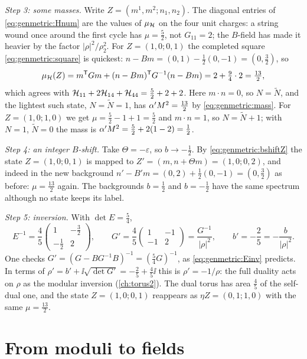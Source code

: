 \emph{Step 3: some masses.} Write $Z=(m^1,m^2;n_1,n_2)$. The diagonal entries of
\eqref{eq:genmetric:Hnum} are the values of $\mu_{\mathcal{H}}$ on the four unit charges: a string
wound once around the first cycle has $\mu=\frac52$, not $G_{11}=2$; the $B$-field has made
it heavier by the factor $|\rho|^2/\rho_2^2$. For $Z=(1,0;0,1)$ the completed square
\eqref{eq:genmetric:square} is quickest: $n-Bm=(0,1)-\tfrac12(0,-1)=(0,\tfrac32)$, so
\[
 \mu_{\mathcal{H}}(Z)=m^{\mathsf T}Gm+(n-Bm)^{\mathsf T}G^{-1}(n-Bm)=2+\tfrac94\cdot2=\tfrac{13}2,
\]
which agrees with $\mathcal{H}_{11}+2\mathcal{H}_{14}+\mathcal{H}_{44}=\frac52+2+2$. Here $m\cdot n=0$, so
$N=\tilde N$, and the lightest such state, $N=\tilde N=1$, has $\alpha' M^2=\frac{13}2$ by
\eqref{eq:genmetric:mass}. For $Z=(1,0;1,0)$ we get $\mu=\frac52-1+1=\frac52$ and
$m\cdot n=1$, so $N=\tilde N+1$; with $N=1$, $\tilde N=0$ the mass is
$\alpha' M^2=\frac52+2(1-2)=\frac12$.

\emph{Step 4: an integer $B$-shift.} Take $\Theta=-\varepsilon$, so $b\to-\frac12$. By
\eqref{eq:genmetric:bshiftZ} the state $Z=(1,0;0,1)$ is mapped to
$Z'=(m,n+\Theta m)=(1,0;0,2)$, and indeed in the new background
$n'-B'm=(0,2)+\tfrac12(0,-1)=(0,\tfrac32)$ as before: $\mu=\frac{13}2$ again. The
backgrounds $b=\frac12$ and $b=-\frac12$ have the same spectrum although no state keeps its
label.

\emph{Step 5: inversion.} With $\det E=\frac54$,
\[
 E^{-1}=\frac45\begin{pmatrix}1&-\frac32\\[1pt]-\frac12&2\end{pmatrix},\qquad
 G'=\frac45\begin{pmatrix}1&-1\\-1&2\end{pmatrix}=\frac{G^{-1}}{|\rho|^2},\qquad
 b'=-\frac25=-\frac{b}{|\rho|^2}.
\]
One checks $G'=(G-BG^{-1}B)^{-1}=(\frac54G)^{-1}$, as \eqref{eq:genmetric:Einv} predicts. In
terms of $\rho'=b'+\ii\sqrt{\det G'}=-\frac25+\frac45\ii$ this is $\rho'=-1/\rho$: the full
duality acts on $\rho$ as the modular inversion (\cref{ch:torus2}). The dual torus has area
$\frac45$ of the self-dual one, and the state $Z=(1,0;0,1)$ reappears as
$\eta Z=(0,1;1,0)$ with the same $\mu=\frac{13}2$.

\section{From moduli to fields}\label{sec:genmetric:fields}

